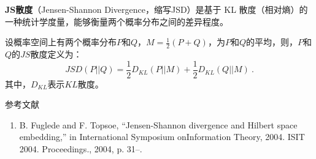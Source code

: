 
\textbf{JS散度}（Jensen-Shannon Divergence，缩写JSD）是基于 KL 散度（相对熵）的一种统计学度量，能够衡量两个概率分布之间的差异程度。

设概率空间上有两个概率分布$P$和$Q$，$M=\frac{1}{2}(P+Q)$，为$P$和$Q$的平均，则，$P$和$Q$的$JS$散度定义为：
\begin{equation}
JSD(P||Q)=\frac{1}{2}D_{KL}(P||M)+\frac{1}{2}D_{KL}(Q||M)~.
\end{equation}
其中，$D_{KL}$表示$KL$散度。



参考文献
\begin{enumerate}
\item B. Fuglede and F. Topsoe, “Jensen-Shannon divergence and Hilbert space embedding,” in International Symposium onInformation Theory, 2004. ISIT 2004. Proceedings., 2004, p. 31–.
\end{enumerate}